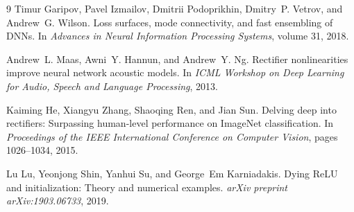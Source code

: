 \documentclass[11pt,a4paper]{article}
\begin{document}
\begin{thebibliography}{9}
Timur Garipov, Pavel Izmailov, Dmitrii Podoprikhin, Dmitry~P. Vetrov, and Andrew~G. Wilson.
\newblock Loss surfaces, mode connectivity, and fast ensembling of DNNs.
\newblock In \emph{Advances in Neural Information Processing Systems}, volume 31, 2018.

Andrew~L. Maas, Awni~Y. Hannun, and Andrew~Y. Ng.
\newblock Rectifier nonlinearities improve neural network acoustic models.
\newblock In \emph{ICML Workshop on Deep Learning for Audio, Speech and Language Processing}, 2013.

Kaiming He, Xiangyu Zhang, Shaoqing Ren, and Jian Sun.
\newblock Delving deep into rectifiers: Surpassing human-level performance on ImageNet classification.
\newblock In \emph{Proceedings of the IEEE International Conference on Computer Vision}, pages 1026--1034, 2015.

Lu Lu, Yeonjong Shin, Yanhui Su, and George~Em Karniadakis.
\newblock Dying ReLU and initialization: Theory and numerical examples.
\newblock \emph{arXiv preprint arXiv:1903.06733}, 2019.

\end{thebibliography}
\end{document}

